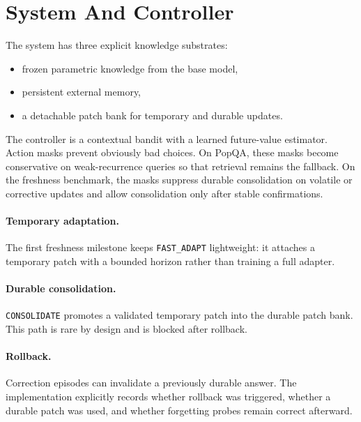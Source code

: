 \section{System And Controller}

The system has three explicit knowledge substrates:
\begin{itemize}[leftmargin=1.5em]
\item frozen parametric knowledge from the base model,
\item persistent external memory,
\item a detachable patch bank for temporary and durable updates.
\end{itemize}

The controller is a contextual bandit with a learned future-value estimator. Action masks prevent obviously bad choices. On PopQA, these masks become conservative on weak-recurrence queries so that retrieval remains the fallback. On the freshness benchmark, the masks suppress durable consolidation on volatile or corrective updates and allow consolidation only after stable confirmations.

\paragraph{Temporary adaptation.}
The first freshness milestone keeps \texttt{FAST\_ADAPT} lightweight: it attaches a temporary patch with a bounded horizon rather than training a full adapter.

\paragraph{Durable consolidation.}
\texttt{CONSOLIDATE} promotes a validated temporary patch into the durable patch bank. This path is rare by design and is blocked after rollback.

\paragraph{Rollback.}
Correction episodes can invalidate a previously durable answer. The implementation explicitly records whether rollback was triggered, whether a durable patch was used, and whether forgetting probes remain correct afterward.
